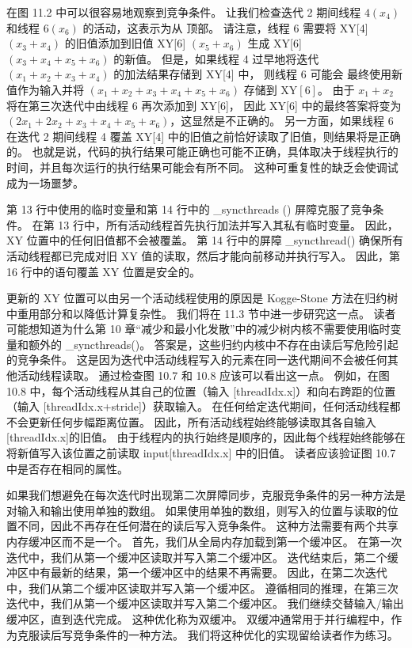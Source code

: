 在图 11.2 中可以很容易地观察到竞争条件。 
让我们检查迭代 2 期间线程 $4\left(x_{4}\right)$ 和线程 $6\left(x_{6}\right)$ 的活动，这表示为从 顶部。 
请注意，线程 6 需要将 XY[4] $(x_{3}+x_{4})$ 的旧值添加到旧值 XY[6] $(x_{5}+x_ {6})$ 
生成 XY[6] $(x_{3}+x_{4}+x_{5}+x_{6})$ 的新值。 
但是，如果线程 4 过早地将迭代 $(x_{1}+x_{2}+x_{3}+x_{4})$ 的加法结果存储到 XY[4] 中，
则线程 6 可能会 最终使用新值作为输入并将 $(x_{1}+x_{2}+x_{3}+x_{4}+x_{5}+x_{6})$ 存储到 $ \mathrm{XY}[6]$。 
由于 $x_{1}+x_{2}$ 将在第三次迭代中由线程 6 再次添加到 XY[6]，
因此 XY[6] 中的最终答案将变为 $(2 x_{1}+2 x_{2}+x_{3}+x_{4}+x_{5}+x_{6})$，这显然是不正确的。 
另一方面，如果线程 6 在迭代 2 期间线程 4 覆盖 XY[4] 中的旧值之前恰好读取了旧值，则结果将是正确的。 
也就是说，代码的执行结果可能正确也可能不正确，具体取决于线程执行的时间，并且每次运行的执行结果可能会有所不同。 
这种可重复性的缺乏会使调试成为一场噩梦。

第 13 行中使用的临时变量和第 14 行中的 \_syncthreads () 屏障克服了竞争条件。
在第 13 行中，所有活动线程首先执行加法并写入其私有临时变量。 因此，XY 位置中的任何旧值都不会被覆盖。 
第 14 行中的屏障 \_syncthread() 确保所有活动线程都已完成对旧 XY 值的读取，然后才能向前移动并执行写入。 
因此，第 16 行中的语句覆盖 XY 位置是安全的。

更新的 XY 位置可以由另一个活动线程使用的原因是 Kogge-Stone 方法在归约树中重用部分和以降低计算复杂性。 
我们将在 11.3 节中进一步研究这一点。 
读者可能想知道为什么第 10 章“减少和最小化发散”中的减少树内核不需要使用临时变量和额外的 \_syncthreads()。 
答案是，这些归约内核中不存在由读后写危险引起的竞争条件。 
这是因为迭代中活动线程写入的元素在同一迭代期间不会被任何其他活动线程读取。 
通过检查图 10.7 和 10.8 应该可以看出这一点。 
例如，在图 10.8 中，每个活动线程从其自己的位置（输入 [threadIdx.x]）和向右跨距的位置（输入 [threadIdx.x+stride]）获取输入。 在任何给定迭代期间，任何活动线程都不会更新任何步幅距离位置。 
因此，所有活动线程始终能够读取其各自输入[threadIdx.x]的旧值。 
由于线程内的执行始终是顺序的，因此每个线程始终能够在将新值写入该位置之前读取 input[threadIdx.x] 中的旧值。 
读者应该验证图 10.7 中是否存在相同的属性。

如果我们想避免在每次迭代时出现第二次屏障同步，克服竞争条件的另一种方法是对输入和输出使用单独的数组。 
如果使用单独的数组，则写入的位置与读取的位置不同，因此不再存在任何潜在的读后写入竞争条件。 
这种方法需要有两个共享内存缓冲区而不是一个。 首先，我们从全局内存加载到第一个缓冲区。 
在第一次迭代中，我们从第一个缓冲区读取并写入第二个缓冲区。 
迭代结束后，第二个缓冲区中有最新的结果，第一个缓冲区中的结果不再需要。 
因此，在第二次迭代中，我们从第二个缓冲区读取并写入第一个缓冲区。 
遵循相同的推理，在第三次迭代中，我们从第一个缓冲区读取并写入第二个缓冲区。 我们继续交替输入/输出缓冲区，直到迭代完成。 
这种优化称为双缓冲。 双缓冲通常用于并行编程中，作为克服读后写竞争条件的一种方法。 我们将这种优化的实现留给读者作为练习。 


